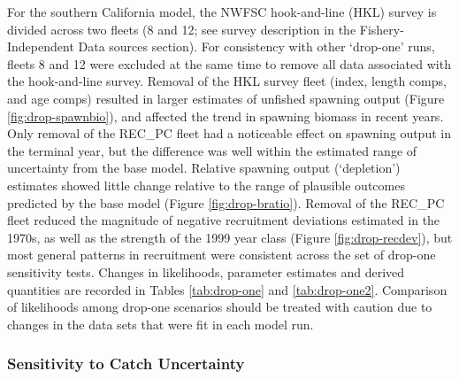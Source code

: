 \documentclass[
  english,
  a4paper,
]{article}
\begin{document}
For the southern California model, the NWFSC hook-and-line (HKL) survey is divided across two fleets (8 and 12; see survey description in the Fishery-Independent Data sources section). For consistency with other `drop-one' runs, fleets 8 and 12 were excluded at the same time to remove all data associated with the hook-and-line survey. Removal of the HKL survey fleet (index, length comps, and age comps) resulted in larger estimates of unfished spawning output (Figure \ref{fig:drop-spawnbio}), and affected the trend in spawning biomass in recent years. Only removal of the REC\_PC fleet had a noticeable effect on spawning output in the terminal year, but the difference was well within the estimated range of uncertainty from the base model. Relative spawning output (`depletion') estimates showed little change relative to the range of plausible outcomes predicted by the base model (Figure \ref{fig:drop-bratio}). Removal of the REC\_PC fleet reduced the magnitude of negative recruitment deviations estimated in the 1970s, as well as the strength of the 1999 year class (Figure \ref{fig:drop-recdev}), but most general patterns in recruitment were consistent across the set of drop-one sensitivity tests. Changes in likelihoods, parameter estimates and derived quantities are recorded in Tables \ref{tab:drop-one} and \ref{tab:drop-one2}. Comparison of likelihoods among drop-one scenarios should be treated with caution due to changes in the data sets that were fit in each model run.

\hypertarget{sensitivity-to-catch-uncertainty}{%
\subsubsection{Sensitivity to Catch Uncertainty}\label{sensitivity-to-catch-uncertainty}}
\end{document}
